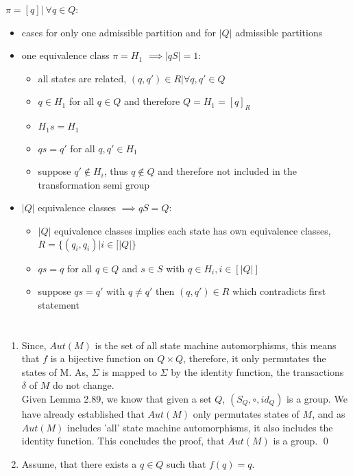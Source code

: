 \documentclass[a4paper,12pt,numbers=noenddot]{scrreport}
\begin{document}
$\pi = {[q] |\ \forall q \in Q}$:
\begin{itemize}
    \item cases for only one admissible partition and for $|Q|$ admissible partitions
    \item one equivalence class $\pi = H_1$ $\implies |qS| = 1$: 
        \begin{itemize}
            \item all states are related, $(q,q') \in R | \forall q,q' \in Q$
            \item $q \in H_1$ for all $q \in Q$  and therefore $Q = H_1 = [q]_R$
            \item $H_1s = H_1$
            \item $qs = q'$ for all $q,q' \in H_1$
            \item suppose $q' \notin H_i$, thus $q \notin Q$ and therefore not included in the transformation semi group
        \end{itemize}
    \item $|Q|$ equivalence classes $\implies qS = Q$:
        \begin{itemize}
            \item $|Q|$ equivalence classes implies each state has own equivalence classes, $R = \{(q_i, q_i) | i \in [|Q|\}$
            \item $qs = q$ for all $q \in Q$ and $s \in S$ with $q \in H_i, i \in [|Q|]$
            \item suppose $qs = q'$ with $q \neq q'$ then $(q, q') \in R$ which contradicts first statement
        \end{itemize}
\end{itemize}


\section{}
\begin{enumerate}
    \item Since, $Aut(M)$ is the set of all state machine automorphisms, this means that $f$ is a bijective function on $Q \times Q$, therefore, it only permutates the states of M. As, $\Sigma$ is  mapped to $\Sigma$ by the identity function, the transactions $\delta$ of $M$ do not change.\\
    Given Lemma 2.89, we know that given a set $Q$, $(S_Q, \circ, id_Q)$ is a group. We have already established that $Aut(M)$ only permutates states of $M$, and as $Aut(M)$ includes 'all' state machine automorphisms, it also includes the identity function.
    This concludes the proof, that $Aut(M)$ is a group.
    \qed
    \item Assume, that there exists a $q \in Q$ such that $f(q) = q$. 
\end{enumerate}

\section{}
\end{document}
